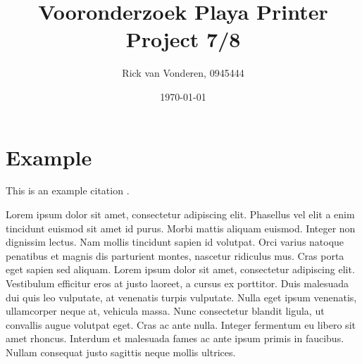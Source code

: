 \documentclass[12pt, a4paper]{article}
\title{\textbf{Vooronderzoek Playa Printer\\Project 7/8}}
\author{Rick van Vonderen, 0945444}
\date{\today}
\begin{document}
	\clearpage\maketitle
	\thispagestyle{empty}
	\newpage

	\setcounter{page}{1}
	\tableofcontents
	\newpage

	\section{Example}
	This is an example citation \cite{example}.

	Lorem ipsum dolor sit amet, consectetur adipiscing elit.
	Phasellus vel elit a enim tincidunt euismod sit amet id purus.
	Morbi mattis aliquam euismod. Integer non dignissim lectus.
	Nam mollis tincidunt sapien id volutpat.
	Orci varius natoque penatibus et magnis dis parturient montes,
	nascetur ridiculus mus.
	Cras porta eget sapien sed aliquam.
	Lorem ipsum dolor sit amet, consectetur adipiscing elit.
	Vestibulum efficitur eros at justo laoreet, a cursus ex porttitor.
	Duis malesuada dui quis leo vulputate, at venenatis turpis vulputate.
	Nulla eget ipsum venenatis, ullamcorper neque at, vehicula massa.
	Nunc consectetur blandit ligula, ut convallis augue volutpat eget.
	Cras ac ante nulla. Integer fermentum eu libero sit amet rhoncus.
	Interdum et malesuada fames ac ante ipsum primis in faucibus.
	Nullam consequat justo sagittis neque mollis ultrices.
	\newpage

	
	\newpage
\end{document}
